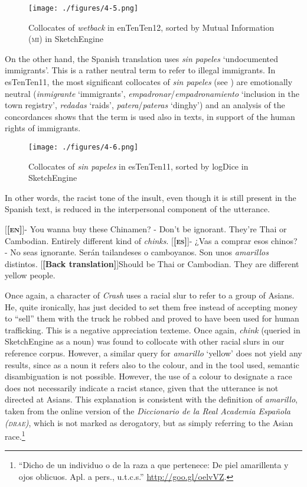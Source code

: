 \documentclass[output=paper]{LSP/langsci}
\begin{document}
\begin{figure}
\texttt{[image: ./figures/4-5.png]}
\caption{Collocates of \emph{wetback} in enTenTen12, sorted by Mutual Information (\textsc{mi}) in SketchEngine} \label{fig:2:6}
\end{figure}

On the other hand, the Spanish translation uses \textit{sin papeles} `undocumented immigrants'. This is a rather neutral term to refer to illegal immigrants. In esTenTen11, the most significant collocates of \textit{sin papeles} (see ) are emotionally neutral (\textit{inmigrante} `immigrants', \textit{empadronar}/\textit{empadronamiento} `inclusion in the town registry', \textit{redadas} `raids', \textit{patera}/\textit{pateras} `dinghy') and an analysis of the concordances shows that the term is used also in texts, in support of the human rights of immigrants.

\begin{figure}
\texttt{[image: ./figures/4-6.png]}
\caption{Collocates of \emph{sin papeles} in esTenTen11, sorted by logDice in SketchEngine} \label{fig:2:7}
\end{figure}

In other words, the racist tone of the insult, even though it is still present in the Spanish text, is reduced in the interpersonal component of the utterance.

\ea \label{ex:2:27}
\begin{xlist}
\exi{}[\textbf{[\textsc{en}]}]{- You wanna buy these Chinamen? - Don't be ignorant. They're Thai or Cambodian. Entirely different kind of \emph{chinks}.}
\exi{}[\textbf{[\textsc{es}]}]{- ¿Vas a comprar esos chinos? - No seas ignorante. Serán tailandeses o camboyanos. Son unos \emph{amarillos} distintos.}
\exi{}[\textbf{[Back translation]}]{Should be Thai or Cambodian. They are different yellow people.}
\end{xlist}
\z

Once again, a character of \textit{Crash} uses a racial slur to refer to a group of Asians. He, quite ironically, has just decided to set them free instead of accepting money to “sell” them with the truck he robbed and proved to have been used for human trafficking. This is a negative appreciation texteme. Once again, \textit{chink} (queried in SketchEngine as a noun) was found to collocate with other racial slurs in our reference corpus. However, a similar query for \textit{amarillo} `yellow' does not yield any results, since as a noun it refers also to the colour, and in the tool used, semantic disambiguation is not possible. However, the use of a colour to designate a race does not necessarily indicate a racist stance, given that the utterance is not directed at Asians. This explanation is consistent with the definition of \textit{amarillo}, taken from the online version of the \textit{Diccionario de la Real Academia Española} \textit{(\textsc{drae})}, which is not marked as derogatory, but as simply referring to the Asian race.\footnote{“Dicho de un individuo o de la raza a que pertenece: De piel amarillenta y ojos oblicuos. Apl. a pers., u.t.c.s.” \url{http://goo.gl/oelvVZ}.}
\end{document}
